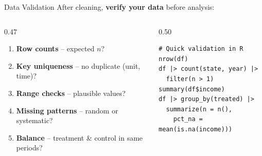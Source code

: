 \begin{frame}[fragile]{Data Validation}
  \small
  After cleaning, \textbf{verify your data} before analysis:

  \vspace{4pt}

  \begin{columns}[T]
    \begin{column}{0.47\textwidth}
      \begin{enumerate}
        \item \textbf{Row counts} -- expected $n$?
        \item \textbf{Key uniqueness} -- no duplicate (unit, time)?
        \item \textbf{Range checks} -- plausible values?
        \item \textbf{Missing patterns} -- random or systematic?
        \item \textbf{Balance} -- treatment \& control in same periods?
      \end{enumerate}
    \end{column}
    \begin{column}{0.50\textwidth}
\begin{lstlisting}[style=terminal, basicstyle=\ttfamily\scriptsize\color{darkgray}]
# Quick validation in R
nrow(df)
df |> count(state, year) |>
  filter(n > 1)
summary(df$income)
df |> group_by(treated) |>
  summarize(n = n(),
    pct_na = mean(is.na(income)))
\end{lstlisting}
    \end{column}
  \end{columns}
\end{frame}

